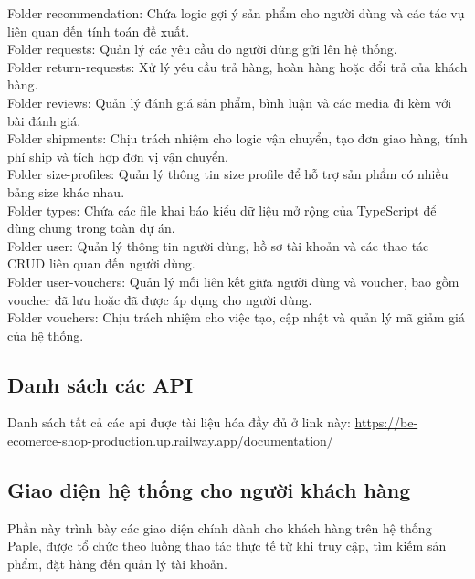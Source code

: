 Folder recommendation: Chứa logic gợi ý sản phẩm cho người dùng và các tác vụ liên quan đến tính toán đề xuất. \\

Folder requests: Quản lý các yêu cầu do người dùng gửi lên hệ thống. \\

Folder return-requests: Xử lý yêu cầu trả hàng, hoàn hàng hoặc đổi trả của khách hàng. \\

Folder reviews: Quản lý đánh giá sản phẩm, bình luận và các media đi kèm với bài đánh giá. \\

Folder shipments: Chịu trách nhiệm cho logic vận chuyển, tạo đơn giao hàng, tính phí ship và tích hợp đơn vị vận chuyển. \\

Folder size-profiles: Quản lý thông tin size profile để hỗ trợ sản phẩm có nhiều bảng size khác nhau. \\

Folder types: Chứa các file khai báo kiểu dữ liệu mở rộng của TypeScript để dùng chung trong toàn dự án. \\

Folder user: Quản lý thông tin người dùng, hồ sơ tài khoản và các thao tác CRUD liên quan đến người dùng. \\

Folder user-vouchers: Quản lý mối liên kết giữa người dùng và voucher, bao gồm voucher đã lưu hoặc đã được áp dụng cho người dùng. \\

Folder vouchers: Chịu trách nhiệm cho việc tạo, cập nhật và quản lý mã giảm giá của hệ thống. \\

\subsection{Danh sách các API}

Danh sách tất cả các api được tài liệu hóa đầy đủ ở link này: \url{https://be-ecomerce-shop-production.up.railway.app/documentation/}

\subsection{Giao diện hệ thống cho người khách hàng}

Phần này trình bày các giao diện chính dành cho khách hàng trên hệ thống Paple, được tổ chức theo luồng thao tác thực tế từ khi truy cập, tìm kiếm sản phẩm, đặt hàng đến quản lý tài khoản.

